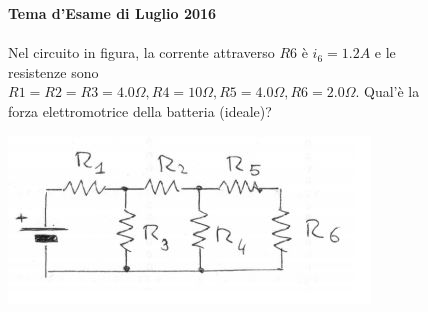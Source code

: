 \begin{figure}[h!]
\textbf{Tema d'Esame di Luglio 2016}\\ \\
Nel circuito in figura, la corrente attraverso $R6$ è $i_6=1.2 A$ e le resistenze sono $R1=R2=R3=4.0 \Omega, R4= 10 \Omega, R5= 4.0 \Omega , R6= 2.0 \Omega$. Qual'è la forza elettromotrice della batteria (ideale)?
	\begin{center}
		\includegraphics[scale=0.8]{ES5/LUG052016.jpg}
	\end{center}
\end{figure}